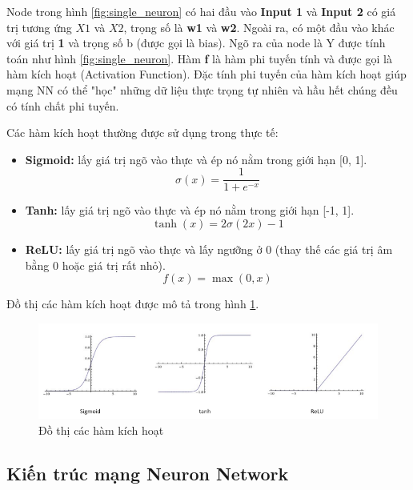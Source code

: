 Node trong hình \ref{fig:single_neuron} có hai đầu vào \textbf{Input 1} và \textbf{Input 2} có giá trị tương ứng $X1$ và $X2$, trọng số là \textbf{w1} và \textbf{w2}. Ngoài ra, có một đầu vào khác với giá trị \textbf{1} và trọng số b (được gọi là bias). Ngõ ra của node là Y được tính toán như hình \ref{fig:single_neuron}. Hàm \textbf{f} là hàm phi tuyến tính và được gọi là hàm kích hoạt (Activation Function). Đặc tính phi tuyến của hàm kích hoạt giúp mạng NN có thể "học" những dữ liệu thực trọng tự nhiên và hầu hết chúng đều có tính chất phi tuyến.

Các hàm kích hoạt thường được sử dụng trong thực tế:
\begin{itemize}
\item \textbf{Sigmoid:} lấy giá trị ngõ vào thực và ép nó nằm trong giới hạn [0, 1].
\begin{equation}
\sigma (x) = \frac{1}{{1 + {e^{ - x}}}}
\end{equation}
\item \textbf{Tanh:} lấy giá trị ngõ vào thực và ép nó nằm trong giới hạn [-1, 1].
\begin{equation}
\tanh (x) = 2\sigma (2x) - 1
\end{equation}
\item \textbf{ReLU:} lấy giá trị ngõ vào thực và lấy ngưỡng ở 0 (thay thế các giá trị âm bằng 0 hoặc giá trị rất nhỏ).
\begin{equation}
f(x) = \max (0,x)
\end{equation}
\end{itemize}

\noindent Đồ thị các hàm kích hoạt được mô tả trong hình \ref{fig:activation_function}.

\FloatBarrier
\begin{figure}[htp]
\begin{center}
\includegraphics[scale=0.8]{chap2/c2_figs/activation_function.PNG}
\end{center}
\caption{Đồ thị các hàm kích hoạt}
\label{fig:activation_function}
\end{figure}
\FloatBarrier


\subsection{Kiến trúc mạng Neuron Network}

